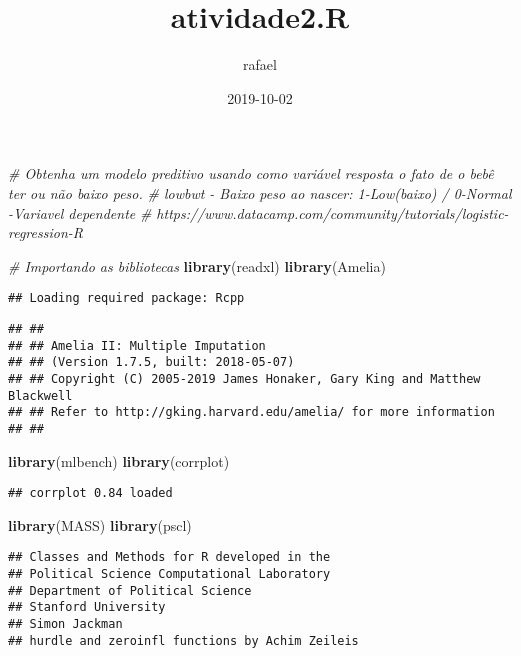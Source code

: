 \documentclass[]{article}
\title{atividade2.R}
\author{rafael}
\date{2019-10-02}
\newenvironment{Shaded}{\begin{snugshade}}{\end{snugshade}}
\newcommand{\CommentTok}[1]{\textcolor[rgb]{0.56,0.35,0.01}{\textit{#1}}}
\newcommand{\KeywordTok}[1]{\textcolor[rgb]{0.13,0.29,0.53}{\textbf{#1}}}
\newcommand{\NormalTok}[1]{#1}
\begin{document}
\maketitle

\begin{Shaded}
\begin{Highlighting}[]
\CommentTok{# Obtenha um modelo preditivo usando como variável resposta o fato de o bebê ter ou não baixo peso.}
\CommentTok{# lowbwt - Baixo peso ao nascer: 1-Low(baixo) / 0-Normal -Variavel dependente}
\CommentTok{# https://www.datacamp.com/community/tutorials/logistic-regression-R}

\CommentTok{# Importando as bibliotecas}
\KeywordTok{library}\NormalTok{(readxl)}
\KeywordTok{library}\NormalTok{(Amelia)}
\end{Highlighting}
\end{Shaded}

\begin{verbatim}
## Loading required package: Rcpp
\end{verbatim}

\begin{verbatim}
## ## 
## ## Amelia II: Multiple Imputation
## ## (Version 1.7.5, built: 2018-05-07)
## ## Copyright (C) 2005-2019 James Honaker, Gary King and Matthew Blackwell
## ## Refer to http://gking.harvard.edu/amelia/ for more information
## ##
\end{verbatim}

\begin{Shaded}
\begin{Highlighting}[]
\KeywordTok{library}\NormalTok{(mlbench)}
\KeywordTok{library}\NormalTok{(corrplot)}
\end{Highlighting}
\end{Shaded}

\begin{verbatim}
## corrplot 0.84 loaded
\end{verbatim}

\begin{Shaded}
\begin{Highlighting}[]
\KeywordTok{library}\NormalTok{(MASS)}
\KeywordTok{library}\NormalTok{(pscl)}
\end{Highlighting}
\end{Shaded}

\begin{verbatim}
## Classes and Methods for R developed in the
## Political Science Computational Laboratory
## Department of Political Science
## Stanford University
## Simon Jackman
## hurdle and zeroinfl functions by Achim Zeileis
\end{verbatim}
\end{document}
